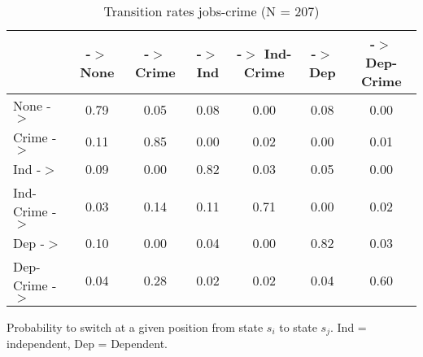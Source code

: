 \begin{table}[htp]
\footnotesize
\setlength{\tabcolsep}{10pt}
\renewcommand{\arraystretch}{1.3}
\begin{threeparttable}
\centering
\caption{Transition rates jobs-crime (N = 207)} 
\label{tab:transition_rates_jobs_crime}
\begin{tabular}{lcccccc}
  \hline
 & -$>$ None & -$>$ Crime & -$>$ Ind & -$>$ Ind-Crime & -$>$ Dep & -$>$ Dep-Crime \\ 
  \hline
None -$>$ & 0.79 & 0.05 & 0.08 & 0.00 & 0.08 & 0.00 \\ 
  Crime -$>$ & 0.11 & 0.85 & 0.00 & 0.02 & 0.00 & 0.01 \\ 
  Ind -$>$ & 0.09 & 0.00 & 0.82 & 0.03 & 0.05 & 0.00 \\ 
  Ind-Crime -$>$ & 0.03 & 0.14 & 0.11 & 0.71 & 0.00 & 0.02 \\ 
  Dep -$>$ & 0.10 & 0.00 & 0.04 & 0.00 & 0.82 & 0.03 \\ 
  Dep-Crime -$>$ & 0.04 & 0.28 & 0.02 & 0.02 & 0.04 & 0.60 \\ 
   \hline
\end{tabular}
\begin{tablenotes}
\scriptsize
\item Probability to switch at a given position from state $s_i$ to state $s_j$. Ind = independent, Dep = Dependent.
\end{tablenotes}
\end{threeparttable}
\end{table}
